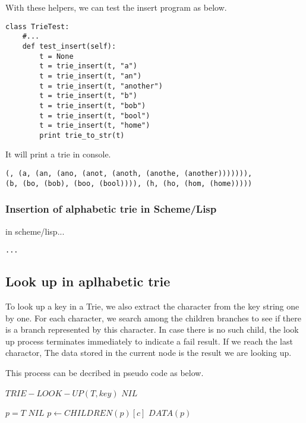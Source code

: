 \documentclass{article}
\begin{document}
With these helpers, we can test the insert program as below.

\begin{lstlisting}
class TrieTest:
    #...
    def test_insert(self):
        t = None
        t = trie_insert(t, "a")
        t = trie_insert(t, "an")
        t = trie_insert(t, "another")
        t = trie_insert(t, "b")
        t = trie_insert(t, "bob")
        t = trie_insert(t, "bool")
        t = trie_insert(t, "home")
        print trie_to_str(t)
\end{lstlisting}

It will print a trie in console.

\begin{verbatim}
(, (a, (an, (ano, (anot, (anoth, (anothe, (another))))))), 
(b, (bo, (bob), (boo, (bool)))), (h, (ho, (hom, (home)))))
\end{verbatim}

\subsubsection*{Insertion of alphabetic trie in Scheme/Lisp}
in scheme/lisp...

\lstset{language=lisp}
\begin{lstlisting}
...
\end{lstlisting}

\subsection{Look up in aplhabetic trie}
To look up a key in a Trie, we also extract the character from the
key string one by one. For each character, we search among the children
branches to see if there is a branch represented by this character.
In case there is no such child, the look up process terminates 
immediately to indicate a fail result. If we reach the last charactor,
The data stored in the current node is the result we are looking up.

This process can be decribed in pseudo code as below.

\begin{algorithmic}
\STATE $TRIE-LOOK-UP(T, key)$
   \RETURN $NIL$ \ENDIF

  \STATE $p=T$
      \RETURN $NIL$
    \ENDIF
    \STATE $p \leftarrow CHILDREN(p)[c]$
  \ENDFOR
  \RETURN $DATA(p)$
\end{algorithmic}
\end{document}
